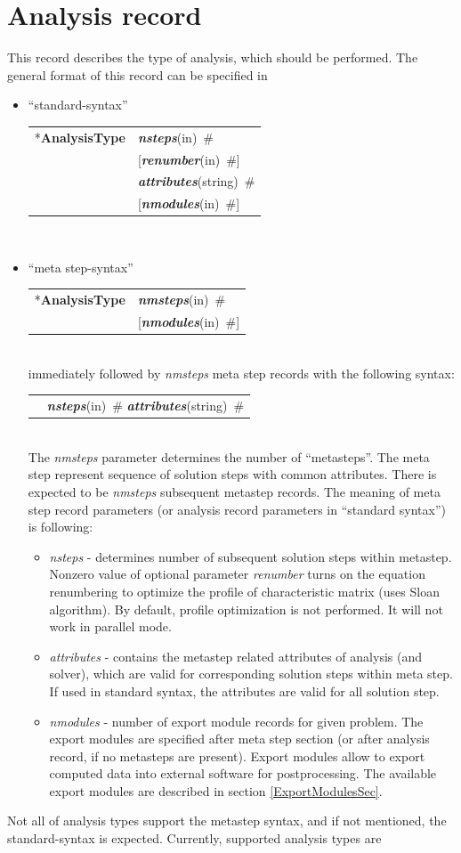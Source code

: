 \documentclass[a4paper]{article}
\makeatletter
\newcommand{\param}[1]{{\em #1}}
\newcommand{\keywordnotype}[1]{\mbox{{\it{\bf{#1}}}}}
\newcommand{\keyword}[2]{\mbox{{\keywordnotype{#1}\tiny (#2)}}}
\newcommand{\entKeyword}[1]{\mbox{{*{\bf{#1}}}}}
\newcommand{\field}[2]{\mbox{\keyword{#1}{#2}~\#}}
\newcommand{\optField}[2]{\mbox{[\field{#1}{#2}]}}
\newenvironment{record}[1][]{\begin{tabular}{|ll}}{\end{tabular}\\}
\newcommand{\recentry}[2]{{#1}&{#2}\\}
\newcounter{rcc}
\newenvironment{record}[1][\textwidth]{\setcounter{rcc}{0}\begin{tabular*}{#1}{|ll@{\extracolsep{\fill}}r}}{\end{tabular*}\\}
\newcommand{\recentry}[2]{\ifthenelse{\value{rcc}>0}{&$\backslash$ \\}{\setcounter{rcc}{1}}{#1}&{#2}}
\makeatother
\begin{document}
\section{Analysis record}
\label{_AnalysisRecord}
This record describes the type of analysis, which should be
performed. The general format of this record can be specified in 
\begin{itemize}
\item ``standard-syntax''\\
  \begin{record}[0.9\textwidth]
    \recentry{\entKeyword{AnalysisType}}{\field{nsteps}{in}} \recentry{}{\optField{renumber}{in}}
    \recentry{}{\field{attributes}{string}} \recentry{}{\optField{nmodules}{in}}
  \end{record}
\item ``meta step-syntax''\\
  \begin{record}[0.9\textwidth]
    \recentry{\entKeyword{AnalysisType}}{\field{nmsteps}{in}}
    \recentry{}{\optField{nmodules}{in}}
  \end{record}
  immediately followed by \param{nmsteps} meta step records with the following syntax:\\
  \begin{record}[0.9\textwidth]
    \recentry{}{\field{nsteps}{in} \field{attributes}{string}}
  \end{record}
  The \param{nmsteps} parameter determines the number of ``metasteps''. The
meta step represent sequence of solution steps with common attributes.
There is expected to be \param{nmsteps} subsequent metastep records.
The meaning of meta step record parameters (or analysis record
parameters in ``standard syntax'') is following:
\begin{itemize}
\item \param{nsteps} - determines number of subsequent solution steps
within me\-ta\-step.
Nonzero value of optional parameter \param{renumber} turns on the
equation renumbering to optimize the profile of characteristic matrix
(uses Sloan algorithm). By default, profile optimization is not
performed. It will not work in parallel mode.
\item \param{attributes} - contains the metastep related attributes of
analysis (and solver), which are valid for corresponding solution
steps within meta step. If used in standard syntax, the attributes are
valid for all solution step.
\item \param{nmodules} - number of export module records for given
problem. The export modules are specified after meta step section (or
after analysis record, if no metasteps are present). Export modules
allow to export computed data into external software for
postprocessing. The available export modules are described in section
\ref{ExportModulesSec}.

\end{itemize}

\end{itemize}
Not all of analysis types support the metastep syntax, and if 
not mentioned, the standard-syntax is expected.
Currently, supported analysis types are
\end{document}
